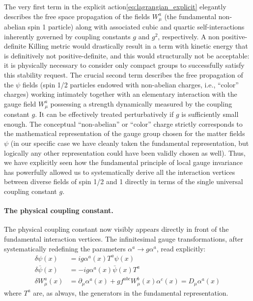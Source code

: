 The very first term in the explicit action\eqref{eq:lagrangian_explicit} elegantly describes the free space propagation of the fields \(W_\mu^a\) (the fundamental non-abelian spin 1 particle) along with associated cubic and quartic self-interactions inherently governed by coupling constants \(g\) and \(g^2\), respectively. A non positive-definite Killing metric would drastically result in a term with kinetic energy that is definitively not positive-definite, and this would structurally not be acceptable: it is physically necessary to consider only compact groups to successfully satisfy this stability request. The crucial second term describes the free propagation of the \(\psi\) fields (spin 1/2 particles endowed with non-abelian charges, i.e., ``color'' charges) working intimately together with an elementary interaction with the gauge field \(W_\mu^a\) possessing a strength dynamically measured by the coupling constant \(g\). It can be effectively treated perturbatively if \(g\) is sufficiently small enough. The conceptual ``non-abelian'' or ``color'' charge strictly corresponds to the mathematical representation of the gauge group chosen for the matter fields \(\psi\) (in our specific case we have cleanly taken the fundamental representation, but logically any other representation could have been validly chosen as well). Thus, we have explicitly seen how the fundamental principle of local gauge invariance has powerfully allowed us to systematically derive all the interaction vertices between diverse fields of spin 1/2 and 1 directly in terms of the single universal coupling constant \(g\).

\paragraph{The physical coupling constant.}
The physical coupling constant now visibly appears directly in front of the fundamental interaction vertices. The infinitesimal gauge transformations, after systematically redefining the parameters \(\alpha^a \rightarrow g\alpha^a\), read explicitly:
\begin{equation} \label{eq:infinitesimal_rescaled}
    \begin{aligned}
        \delta\psi(x)       & = ig\alpha^a(x)T^a\psi(x)                                                     \\
        \delta\bar{\psi}(x) & = -ig\alpha^a(x)\bar{\psi}(x)T^a                                              \\
        \delta W_\mu^a(x)   & = \partial_\mu\alpha^a(x) + g f^{abc}W_\mu^b(x)\alpha^c(x) = D_\mu\alpha^a(x)
    \end{aligned}
\end{equation}
where \(T^a\) are, as always, the generators in the fundamental representation.


